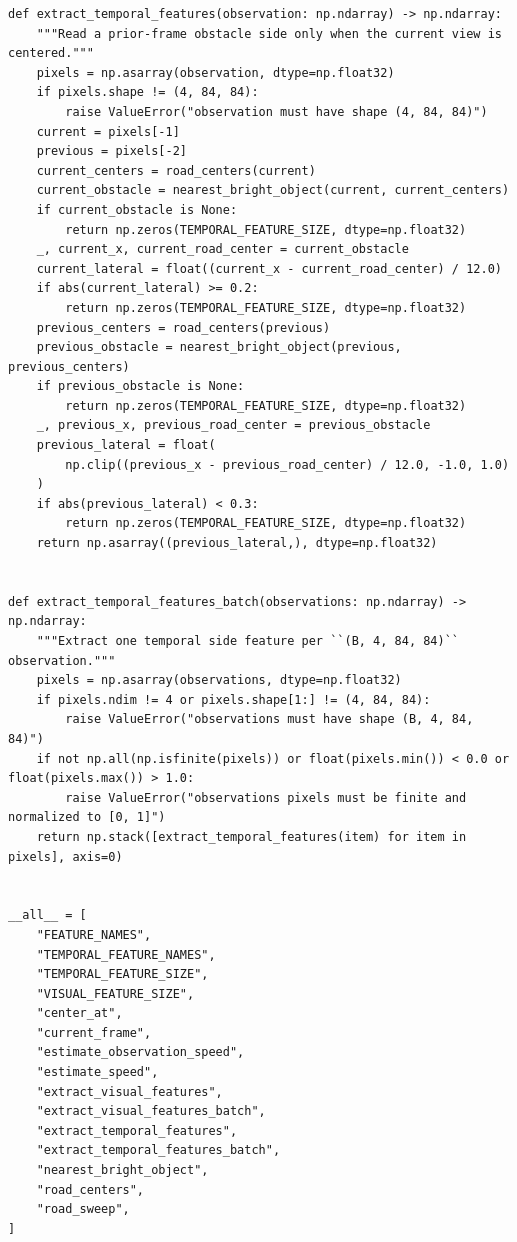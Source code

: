 \documentclass[11pt,a4paper]{article}
\begin{document}
\begin{lstlisting}
def extract_temporal_features(observation: np.ndarray) -> np.ndarray:
    """Read a prior-frame obstacle side only when the current view is centered."""
    pixels = np.asarray(observation, dtype=np.float32)
    if pixels.shape != (4, 84, 84):
        raise ValueError("observation must have shape (4, 84, 84)")
    current = pixels[-1]
    previous = pixels[-2]
    current_centers = road_centers(current)
    current_obstacle = nearest_bright_object(current, current_centers)
    if current_obstacle is None:
        return np.zeros(TEMPORAL_FEATURE_SIZE, dtype=np.float32)
    _, current_x, current_road_center = current_obstacle
    current_lateral = float((current_x - current_road_center) / 12.0)
    if abs(current_lateral) >= 0.2:
        return np.zeros(TEMPORAL_FEATURE_SIZE, dtype=np.float32)
    previous_centers = road_centers(previous)
    previous_obstacle = nearest_bright_object(previous, previous_centers)
    if previous_obstacle is None:
        return np.zeros(TEMPORAL_FEATURE_SIZE, dtype=np.float32)
    _, previous_x, previous_road_center = previous_obstacle
    previous_lateral = float(
        np.clip((previous_x - previous_road_center) / 12.0, -1.0, 1.0)
    )
    if abs(previous_lateral) < 0.3:
        return np.zeros(TEMPORAL_FEATURE_SIZE, dtype=np.float32)
    return np.asarray((previous_lateral,), dtype=np.float32)


def extract_temporal_features_batch(observations: np.ndarray) -> np.ndarray:
    """Extract one temporal side feature per ``(B, 4, 84, 84)`` observation."""
    pixels = np.asarray(observations, dtype=np.float32)
    if pixels.ndim != 4 or pixels.shape[1:] != (4, 84, 84):
        raise ValueError("observations must have shape (B, 4, 84, 84)")
    if not np.all(np.isfinite(pixels)) or float(pixels.min()) < 0.0 or float(pixels.max()) > 1.0:
        raise ValueError("observations pixels must be finite and normalized to [0, 1]")
    return np.stack([extract_temporal_features(item) for item in pixels], axis=0)


__all__ = [
    "FEATURE_NAMES",
    "TEMPORAL_FEATURE_NAMES",
    "TEMPORAL_FEATURE_SIZE",
    "VISUAL_FEATURE_SIZE",
    "center_at",
    "current_frame",
    "estimate_observation_speed",
    "estimate_speed",
    "extract_visual_features",
    "extract_visual_features_batch",
    "extract_temporal_features",
    "extract_temporal_features_batch",
    "nearest_bright_object",
    "road_centers",
    "road_sweep",
]

\end{lstlisting}
\end{document}
